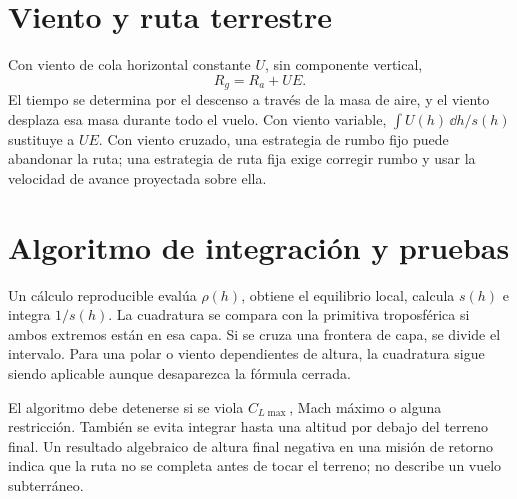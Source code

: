 \section{Viento y ruta terrestre}
Con viento de cola horizontal constante $U$, sin componente vertical,
\begin{equation}
R_g=R_a+UE.
\label{eq:glidewind}
\end{equation}
El tiempo se determina por el descenso a través de la masa de aire, y el viento desplaza esa masa durante todo el vuelo. Con viento variable, $\int U(h)\,\dd h/s(h)$ sustituye a $UE$. Con viento cruzado, una estrategia de rumbo fijo puede abandonar la ruta; una estrategia de ruta fija exige corregir rumbo y usar la velocidad de avance proyectada sobre ella.


\section{Algoritmo de integración y pruebas}
Un cálculo reproducible evalúa $\rho(h)$, obtiene el equilibrio local, calcula $s(h)$ e integra $1/s(h)$. La cuadratura se compara con la primitiva troposférica si ambos extremos están en esa capa. Si se cruza una frontera de capa, se divide el intervalo. Para una polar o viento dependientes de altura, la cuadratura sigue siendo aplicable aunque desaparezca la fórmula cerrada.

El algoritmo debe detenerse si se viola $C_{L\max}$, Mach máximo o alguna restricción. También se evita integrar hasta una altitud por debajo del terreno final. Un resultado algebraico de altura final negativa en una misión de retorno indica que la ruta no se completa antes de tocar el terreno; no describe un vuelo subterráneo.


